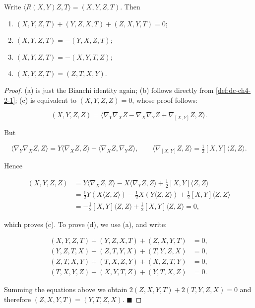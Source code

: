 \begin{proposition}
  \label{prop:dc-ch4-2-5}


  Write $\langle R(X,Y)Z,T\rangle=(X,Y,Z,T)$. Then
  \begin{enumerate}
  \item[(a)] $(X,Y,Z,T)+(Y,Z,X,T)+(Z,X,Y,T)=0$;
  \item[(b)] $(X,Y,Z,T)=-(Y,X,Z,T)$;
  \item[(c)] $(X,Y,Z,T)=-(X,Y,T,Z)$;
  \item[(d)] $(X,Y,Z,T)=(Z,T,X,Y)$.
  \end{enumerate}
\end{proposition}
\begin{proof}

  \sketch
  (a) is just the Bianchi identity again; (b) follows directly from \cref{def:dc-ch4-2-1};
  (c) is equivalent to $(X,Y,Z,Z)=0$, whose proof follows:

  $$
  (X,Y,Z,Z)=\langle\nabla_Y\nabla_X Z-\nabla_X\nabla_Y Z+\nabla_{[X,Y]}Z,Z\rangle.
  $$

  But

  $$
  \langle\nabla_Y\nabla_X Z,Z\rangle=Y\langle\nabla_X Z,Z\rangle-\langle\nabla_X Z,\nabla_Y Z\rangle,\qquad\langle\nabla_{[X,Y]}Z,Z\rangle=\tfrac{1}{2}[X,Y]\langle Z,Z\rangle.
  $$

  Hence

  $$
  \begin{aligned}(X,Y,Z,Z)&=Y\langle\nabla_X Z,Z\rangle-X\langle\nabla_Y Z,Z\rangle+\tfrac{1}{2}[X,Y]\langle Z,Z\rangle\\&=\tfrac{1}{2}Y(X\langle Z,Z\rangle)-\tfrac{1}{2}X(Y\langle Z,Z\rangle)+\tfrac{1}{2}[X,Y]\langle Z,Z\rangle\\&=-\tfrac{1}{2}[X,Y]\langle Z,Z\rangle+\tfrac{1}{2}[X,Y]\langle Z,Z\rangle=0,\end{aligned}
  $$

  which proves (c). To prove (d), we use (a), and write:

  $$
  \begin{aligned}(X,Y,Z,T)+(Y,Z,X,T)+(Z,X,Y,T)&=0,\\(Y,Z,T,X)+(Z,T,Y,X)+(T,Y,Z,X)&=0,\\(Z,T,X,Y)+(T,X,Z,Y)+(X,Z,T,Y)&=0,\\(T,X,Y,Z)+(X,Y,T,Z)+(Y,T,X,Z)&=0.\end{aligned}
  $$

  Summing the equations above we obtain $2(Z,X,Y,T)+2(T,Y,Z,X)=0$ and therefore
  $(Z,X,Y,T)=(Y,T,Z,X)$. $\blacksquare$
\end{proof}

